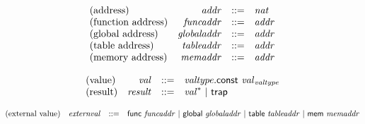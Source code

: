 $$
\begin{array}{@{}lrrl@{}l@{}}
\mbox{(address)} & {\mathit{addr}} &::=& {\mathit{nat}} \\
\mbox{(function address)} & {\mathit{funcaddr}} &::=& {\mathit{addr}} \\
\mbox{(global address)} & {\mathit{globaladdr}} &::=& {\mathit{addr}} \\
\mbox{(table address)} & {\mathit{tableaddr}} &::=& {\mathit{addr}} \\
\mbox{(memory address)} & {\mathit{memaddr}} &::=& {\mathit{addr}} \\
\end{array}
$$

\vspace{1ex}

\vspace{1ex}

$$
\begin{array}{@{}lrrl@{}l@{}}
\mbox{(value)} & {\mathit{val}} &::=& {\mathit{valtype}}.\mathsf{const}~{{\mathit{val}}}_{{\mathit{valtype}}} \\
\mbox{(result)} & {\mathit{result}} &::=& {{\mathit{val}}^\ast} ~|~ \mathsf{trap} \\
\end{array}
$$

\vspace{1ex}

$$
\begin{array}{@{}lrrl@{}l@{}}
\mbox{(external value)} & {\mathit{externval}} &::=& \mathsf{func}~{\mathit{funcaddr}} ~|~ \mathsf{global}~{\mathit{globaladdr}} ~|~ \mathsf{table}~{\mathit{tableaddr}} ~|~ \mathsf{mem}~{\mathit{memaddr}} \\
\end{array}
$$

\vspace{1ex}

\vspace{1ex}

